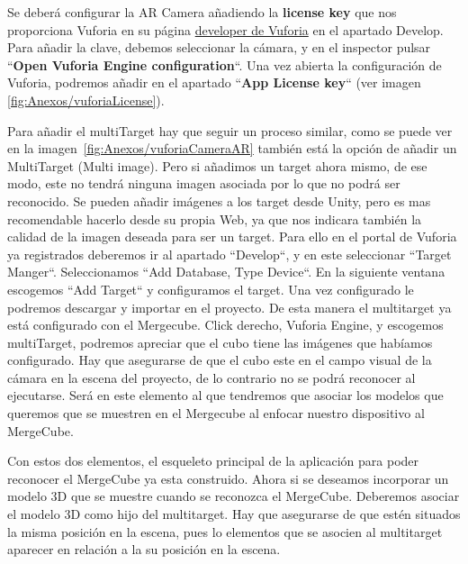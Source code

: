 Se deberá configurar la AR Camera añadiendo la \textbf{license key} que nos proporciona Vuforia en su página \href{https://developer.vuforia.com/license-manager}{developer de Vuforia} en el apartado Develop. Para añadir la clave, debemos seleccionar la cámara, y en el inspector pulsar ``\textbf{Open Vuforia Engine configuration}``. Una vez abierta la configuración de Vuforia, podremos añadir en el apartado ``\textbf{App License key}`` (ver imagen \ref{fig:Anexos/vuforiaLicense}). 



Para añadir el multiTarget hay que seguir un proceso similar, como se puede ver en la imagen~\ref{fig:Anexos/vuforiaCameraAR} también está la opción de añadir un MultiTarget (Multi image). Pero si añadimos un target ahora mismo, de ese modo, este no tendrá ninguna imagen asociada por lo que no podrá ser reconocido. Se pueden añadir imágenes a los target desde Unity, pero es mas recomendable hacerlo desde su propia Web, ya que nos indicara también la calidad de la imagen deseada para ser un target. Para ello en el portal de Vuforia ya registrados deberemos ir al apartado ``Develop``, y en este seleccionar ``Target Manger``. Seleccionamos ``Add Database, Type Device``. En la siguiente ventana escogemos ``Add Target`` y configuramos el target. Una vez configurado le podremos descargar y importar en el proyecto. De esta manera el multitarget ya está configurado con el Mergecube. Click derecho, Vuforia Engine, y escogemos multiTarget, podremos apreciar que el cubo tiene las imágenes que habíamos configurado. Hay que asegurarse de que el cubo este en el campo visual de la cámara en la escena del proyecto, de lo contrario no se podrá reconocer al ejecutarse. Será en este elemento al que tendremos que asociar los modelos que queremos que se muestren en el Mergecube al enfocar nuestro dispositivo al MergeCube.


Con estos dos elementos, el esqueleto principal de la aplicación para poder reconocer el MergeCube ya esta construido. Ahora si se deseamos incorporar un modelo 3D que se muestre cuando se reconozca el MergeCube. Deberemos asociar el modelo 3D como hijo del multitarget. Hay que asegurarse de que estén situados la misma posición en la escena, pues lo elementos que se asocien al multitarget aparecer en relación a la su posición en la escena.


